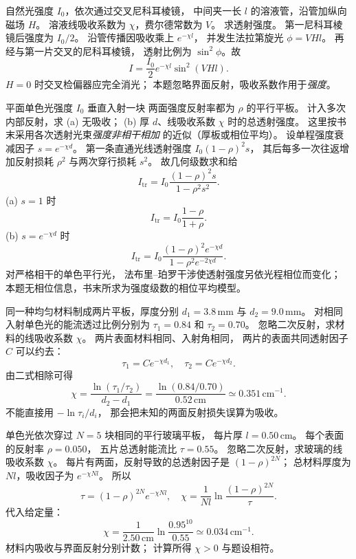 自然光强度 $I_0$，依次通过交叉尼科耳棱镜，
中间夹一长 $l$ 的溶液管，沿管加纵向磁场 $H$。
溶液线吸收系数为 $\chi$，费尔德常数为 $V$。
求透射强度。
\exsolution
第一尼科耳棱镜后强度为 $I_0/2$。
沿管传播因吸收乘上 $e^{-\chi l}$，
并发生法拉第旋光 $\phi=VHl$。
再经与第一片交叉的尼科耳棱镜，
透射比例为 $\sin^2\phi$。故
\[
 \boxed{I=\frac{I_0}{2}e^{-\chi l}\sin^2(VHl)}.
\]
\excheck $H=0$ 时交叉检偏器应完全消光；
本题忽略界面反射，吸收系数作用于\emph{强度}。

平面单色光强度 $I_0$ 垂直入射一块
两面强度反射率都为 $\rho$ 的平行平板。
计入多次内部反射，求
(a) 无吸收；
(b) 厚 $d$、线吸收系数 $\chi$ 时的总透射强度。
\exsolution
这里按书末采用各次透射光束\emph{强度非相干相加}
的近似（厚板或相位平均）。
设单程强度衰减因子 $s=e^{-\chi d}$。
第一条直通光线透射强度
$I_0(1-\rho)^2s$，
其后每多一次往返增加反射损耗 $\rho^2$
与两次穿行损耗 $s^2$。
故几何级数求和给
\[
 \boxed{I_{\mathrm{tr}}=
 I_0\frac{(1-\rho)^2s}{1-\rho^2s^2}}.
\]
(a) $s=1$ 时
\[
 \boxed{I_{\mathrm{tr}}=I_0\frac{1-\rho}{1+\rho}}.
\]
(b) $s=e^{-\chi d}$ 时
\[
 \boxed{I_{\mathrm{tr}}=
 I_0\frac{(1-\rho)^2e^{-\chi d}}
 {1-\rho^2e^{-2\chi d}}}.
\]
\excheck 对严格相干的单色平行光，
法布里--珀罗干涉使透射强度另依光程相位而变化；
本题无相位信息，书末所求为强度级数的相位平均模型。

同一种均匀材料制成两片平板，厚度分别
$d_1=3.8\,\mathrm{mm}$ 与 $d_2=9.0\,\mathrm{mm}$。
对相同入射单色光的能流透过比例分别为
$\tau_1=0.84$ 和 $\tau_2=0.70$。
忽略二次反射，求材料的线吸收系数 $\chi$。
\exsolution
两片表面材料相同、入射角相同，
两片的表面共同透射因子 $C$ 可以约去：
\[
 \tau_1=C e^{-\chi d_1},\quad
 \tau_2=C e^{-\chi d_2}.
\]
由二式相除可得
\[
 \boxed{\chi=\frac{\ln(\tau_1/\tau_2)}{d_2-d_1}
 =\frac{\ln(0.84/0.70)}{0.52\,\mathrm{cm}}
 \simeq0.351\,\mathrm{cm^{-1}}}.
\]
\excheck 不能直接用 $-\ln\tau_i/d_i$，
那会把未知的两面反射损失误算为吸收。

单色光依次穿过 $N=5$ 块相同的平行玻璃平板，
每片厚 $l=0.50\,\mathrm{cm}$。
每个表面的反射率 $\rho=0.050$，
五片总透射能流比 $\tau=0.55$。
忽略二次反射，求玻璃的线吸收系数 $\chi$。
\exsolution
每片有两面，反射导致的总透射因子是
$(1-\rho)^{2N}$；
总材料厚度为 $Nl$，吸收因子为 $e^{-\chi Nl}$。
所以
\[
 \tau=(1-\rho)^{2N}e^{-\chi Nl},
 \quad
 \boxed{\chi=\frac1{Nl}
 \ln\frac{(1-\rho)^{2N}}{\tau}}.
\]
代入给定量：
\[
 \boxed{\chi=\frac1{2.50\,\mathrm{cm}}
 \ln\frac{0.95^{10}}{0.55}
 \simeq0.034\,\mathrm{cm^{-1}}}.
\]
\excheck 材料内吸收与界面反射分别计数；
计算所得 $\chi>0$ 与题设相符。
